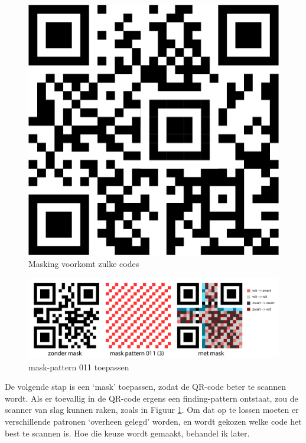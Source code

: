 \documentclass[a4paper]{article}
\begin{document}
\begin{figure}
\includegraphics[width=\linewidth]{waarom-masks.png}
\caption{Masking voorkomt zulke codes}
\label{fig:waarom-mask}
\end{figure}
\begin{figure}[!htbp]
\centering
\includegraphics[width=\linewidth]{mask-qr.pdf}
\caption{mask-pattern 011 toepassen}
\label{fig:apply-mask}
\end{figure}

De volgende stap is een `mask' toepassen, zodat de QR-code beter te scannen wordt. Als er toevallig in de QR-code ergens een finding-pattern ontstaat, zou de scanner van slag kunnen raken, zoals in Figuur \ref{fig:waarom-mask}. Om dat op te lossen moeten er verschillende patronen `overheen gelegd' worden, en wordt gekozen welke code het best te scannen is. Hoe die keuze wordt gemaakt, behandel ik later.
\end{document}

